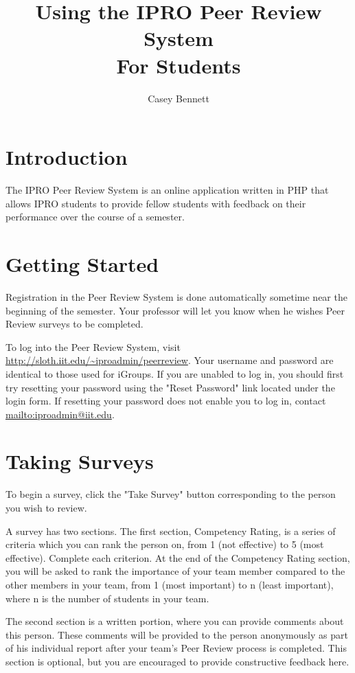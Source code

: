 \documentclass{article}
\title{Using the IPRO Peer Review System\\For Students}
\author{Casey Bennett}
\begin{document}
\maketitle
\tableofcontents
\newpage

\section{Introduction}

The IPRO Peer Review System is an online application written in PHP that allows IPRO students to provide fellow students with feedback on their performance over the course of a semester.

\section{Getting Started}

Registration in the Peer Review System is done automatically sometime near the beginning of the semester. Your professor will let you know when he wishes Peer Review surveys to be completed.

To log into the Peer Review System, visit \url{http://sloth.iit.edu/~iproadmin/peerreview}. Your username and password are identical to those used for iGroups. If you are unabled to log in, you should first try resetting your password using the "Reset Password" link located under the login form. If resetting your password does not enable you to log in, contact \url{mailto:iproadmin@iit.edu}.

\section{Taking Surveys}

To begin a survey, click the "Take Survey" button corresponding to the person you wish to review.

A survey has two sections. The first section, Competency Rating, is a series of criteria which you can rank the person on, from 1 (not effective) to 5 (most effective). Complete each criterion. At the end of the Competency Rating section, you will be asked to rank the importance of your team member compared to the other members in your team, from 1 (most important) to n (least important), where n is the number of students in your team.

The second section is a written portion, where you can provide comments about this person. These comments will be provided to the person anonymously as part of his individual report after your team's Peer Review process is completed. This section is optional, but you are encouraged to provide constructive feedback here.
\end{document}
